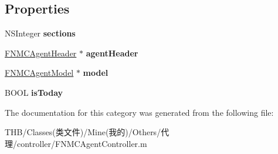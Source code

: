 \subsection*{Properties}
\begin{DoxyCompactItemize}
\item 
\mbox{\label{category_f_n_m_c_agent_controller_07_08_aaba7af34200224f7d7fe0cbfefb929c7}} 
N\+S\+Integer {\bfseries sections}
\item 
\mbox{\label{category_f_n_m_c_agent_controller_07_08_ac233ddf7da8250676765f1faf35ecac1}} 
\mbox{\hyperlink{interface_f_n_m_c_agent_header}{F\+N\+M\+C\+Agent\+Header}} $\ast$ {\bfseries agent\+Header}
\item 
\mbox{\label{category_f_n_m_c_agent_controller_07_08_a11a4b8b6694bbfed614f49e8f89ef118}} 
\mbox{\hyperlink{interface_f_n_m_c_agent_model}{F\+N\+M\+C\+Agent\+Model}} $\ast$ {\bfseries model}
\item 
\mbox{\label{category_f_n_m_c_agent_controller_07_08_a3a4ac77e06a6f5696f03383dbe08cf0f}} 
B\+O\+OL {\bfseries is\+Today}
\end{DoxyCompactItemize}


The documentation for this category was generated from the following file\+:\begin{DoxyCompactItemize}
\item 
T\+H\+B/\+Classes(类文件)/\+Mine(我的)/\+Others/代理/controller/F\+N\+M\+C\+Agent\+Controller.\+m\end{DoxyCompactItemize}
